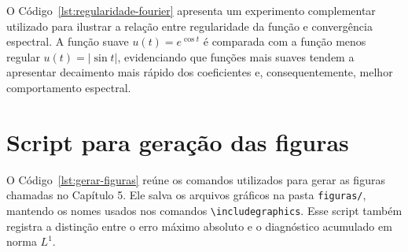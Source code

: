 O Código~\ref{lst:regularidade-fourier} apresenta um experimento complementar utilizado para ilustrar a relação entre regularidade da função e convergência espectral. A função suave \(u(t)=e^{\cos t}\) é comparada com a função menos regular \(u(t)=|\sin t|\), evidenciando que funções mais suaves tendem a apresentar decaimento mais rápido dos coeficientes e, consequentemente, melhor comportamento espectral.



\section{Script para geração das figuras}

O Código~\ref{lst:gerar-figuras} reúne os comandos utilizados para gerar as figuras chamadas no Capítulo 5. Ele salva os arquivos gráficos na pasta \texttt{figuras/}, mantendo os nomes usados nos comandos \texttt{\textbackslash includegraphics}. Esse script também registra a distinção entre o erro máximo absoluto e o diagnóstico acumulado em norma \(L^1\).


